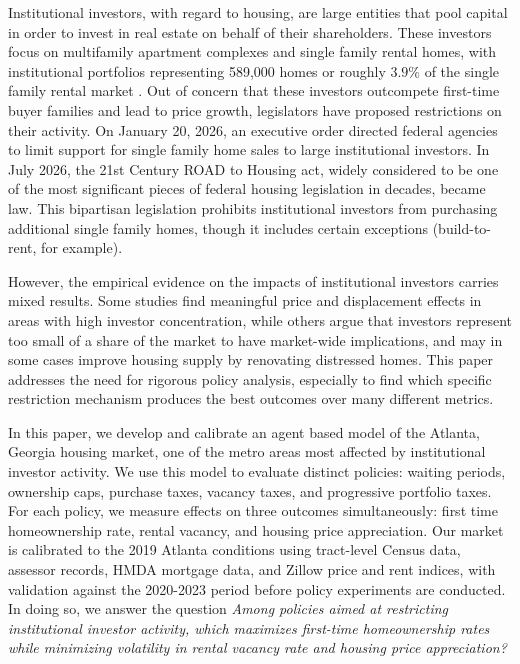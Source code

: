 \documentclass[twocolumn,showpacs,%
  nofootinbib,aps,superscriptaddress,%
  eqsecnum,prd,notitlepage,showkeys,10pt]{revtex4-1}
\begin{document}
Institutional investors, with regard to housing, are large entities that pool capital in order to invest in real estate on behalf of their shareholders. These investors focus on multifamily apartment complexes and single family rental homes, with institutional portfolios representing 589,000 homes or roughly $3.9\%$ of the single family rental market \cite{urbaninvestor2022}. Out of concern that these investors outcompete first-time buyer families and lead to price growth, legislators have proposed restrictions on their activity. On January 20, 2026, an executive order directed federal agencies to limit support for single family home sales to large institutional investors. In July 2026, the 21st Century ROAD to Housing act, widely considered to be one of the most significant pieces of federal housing legislation in decades, became law. This bipartisan legislation prohibits institutional investors from purchasing additional single family homes, though it includes certain exceptions (build-to-rent, for example). \newline 

However, the empirical evidence on the impacts of institutional investors carries mixed results. Some studies find meaningful price and displacement effects in areas with high investor concentration, while others argue that investors represent too small of a share of the market to have market-wide implications, and may in some cases improve housing supply by renovating distressed homes. This paper addresses the need for rigorous policy analysis, especially to find which specific restriction mechanism produces the best outcomes over many different metrics. \newline

In this paper, we develop and calibrate an agent based model of the Atlanta, Georgia housing market, one of the metro areas most affected by institutional investor activity. We use this model to evaluate distinct policies: waiting periods, ownership caps, purchase taxes, vacancy taxes, and progressive portfolio taxes. For each policy, we measure effects on three outcomes simultaneously: first time homeownership rate, rental vacancy, and housing price appreciation. Our market is calibrated to the 2019 Atlanta conditions using tract-level Census data, assessor records, HMDA mortgage data, and Zillow price and rent indices, with validation against the 2020-2023 period before policy experiments are conducted. In doing so, we answer the question \textit{Among policies aimed at restricting institutional investor activity, which maximizes first-time homeownership rates while minimizing volatility in rental vacancy rate and housing price appreciation?}\newline
\end{document}

